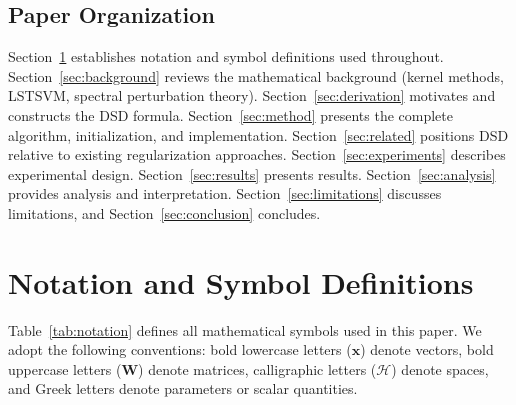 \documentclass[journal]{IEEEtran}
\begin{document}
\subsection{Paper Organization}

Section~\ref{sec:notation} establishes notation and symbol definitions used throughout. Section~\ref{sec:background} reviews the mathematical background (kernel methods, LSTSVM, spectral perturbation theory). Section~\ref{sec:derivation} motivates and constructs the DSD formula. Section~\ref{sec:method} presents the complete algorithm, initialization, and implementation. Section~\ref{sec:related} positions DSD relative to existing regularization approaches. Section~\ref{sec:experiments} describes experimental design. Section~\ref{sec:results} presents results. Section~\ref{sec:analysis} provides analysis and interpretation. Section~\ref{sec:limitations} discusses limitations, and Section~\ref{sec:conclusion} concludes.


\section{Notation and Symbol Definitions}
\label{sec:notation}

Table~\ref{tab:notation} defines all mathematical symbols used in this paper. We adopt the following conventions: bold lowercase letters ($\bm{x}$) denote vectors, bold uppercase letters ($\bm{W}$) denote matrices, calligraphic letters ($\mathcal{H}$) denote spaces, and Greek letters denote parameters or scalar quantities.
\end{document}
